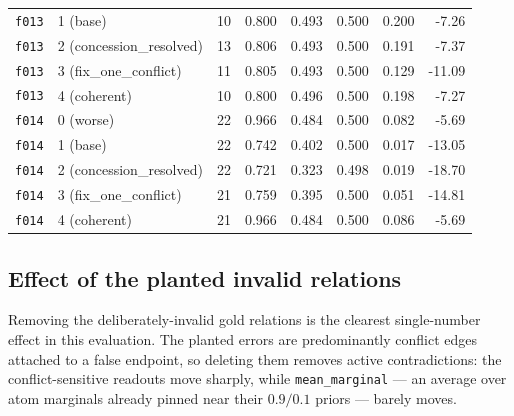 \documentclass[11pt]{article}
\begin{document}
\begin{table}[htbp]
\begin{tabular}{llrrrrrr}
\texttt{f013} & 1 (base) & 10 & 0.800 & 0.493 & 0.500 & 0.200 & -7.26 \\
\texttt{f013} & 2 (concession\_resolved) & 13 & 0.806 & 0.493 & 0.500 & 0.191 & -7.37 \\
\texttt{f013} & 3 (fix\_one\_conflict) & 11 & 0.805 & 0.493 & 0.500 & 0.129 & -11.09 \\
\texttt{f013} & 4 (coherent) & 10 & 0.800 & 0.496 & 0.500 & 0.198 & -7.27 \\
\midrule
\texttt{f014} & 0 (worse) & 22 & 0.966 & 0.484 & 0.500 & 0.082 & -5.69 \\
\texttt{f014} & 1 (base) & 22 & 0.742 & 0.402 & 0.500 & 0.017 & -13.05 \\
\texttt{f014} & 2 (concession\_resolved) & 22 & 0.721 & 0.323 & 0.498 & 0.019 & -18.70 \\
\texttt{f014} & 3 (fix\_one\_conflict) & 21 & 0.759 & 0.395 & 0.500 & 0.051 & -14.81 \\
\texttt{f014} & 4 (coherent) & 21 & 0.966 & 0.484 & 0.500 & 0.086 & -5.69 \\
\bottomrule
\end{tabular}
\end{table}

\subsection{Effect of the planted invalid relations}

Removing the deliberately-invalid gold relations is the clearest single-number effect in this evaluation. The planted errors are predominantly conflict edges attached to a false endpoint, so deleting them removes active contradictions: the conflict-sensitive readouts move sharply, while \texttt{mean\_marginal} --- an average over atom marginals already pinned near their $0.9/0.1$ priors --- barely moves.
\end{document}

